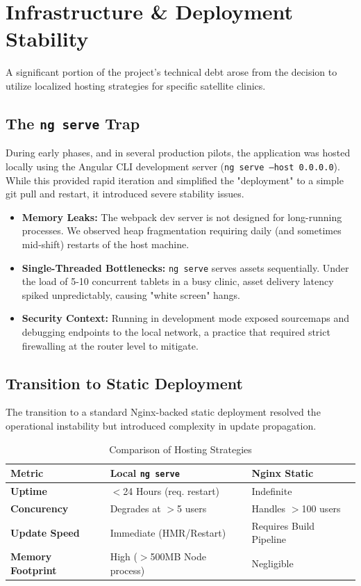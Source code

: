 \documentclass[12pt, openright, twoside, a4paper, english, french, spanish]{abntex2}
\begin{document}
\section{Infrastructure \& Deployment Stability}
\label{sec:infrastructure_challenges}

A significant portion of the project's technical debt arose from the decision to utilize localized hosting strategies for specific satellite clinics.

\subsection{The \texttt{ng serve} Trap}
During early phases, and in several production pilots, the application was hosted locally using the Angular CLI development server (\texttt{ng serve --host 0.0.0.0}). While this provided rapid iteration and simplified the "deployment" to a simple git pull and restart, it introduced severe stability issues.

\begin{itemize}
    \item \textbf{Memory Leaks:} The webpack dev server is not designed for long-running processes. We observed heap fragmentation requiring daily (and sometimes mid-shift) restarts of the host machine.
    \item \textbf{Single-Threaded Bottlenecks:} \texttt{ng serve} serves assets sequentially. Under the load of 5-10 concurrent tablets in a busy clinic, asset delivery latency spiked unpredictably, causing "white screen" hangs.
    \item \textbf{Security Context:} Running in development mode exposed sourcemaps and debugging endpoints to the local network, a practice that required strict firewalling at the router level to mitigate.
\end{itemize}

\subsection{Transition to Static Deployment}
The transition to a standard Nginx-backed static deployment resolved the operational instability but introduced complexity in update propagation.

\begin{table}[h]
\centering
\begin{tabular}{|l|l|l|}
\hline
\textbf{Metric} & \textbf{Local \texttt{ng serve}} & \textbf{Nginx Static} \\ \hline
\textbf{Uptime} & $<$24 Hours (req. restart) & Indefinite \\ \hline
\textbf{Concurency} & Degrades at $>$5 users & Handles $>$100 users \\ \hline
\textbf{Update Speed} & Immediate (HMR/Restart) & Requires Build Pipeline \\ \hline
\textbf{Memory Footprint} & High ($>$500MB Node process) & Negligible \\ \hline
\end{tabular}
\caption{Comparison of Hosting Strategies}
\label{tab:hosting_comparison}
\end{table}
\end{document}
